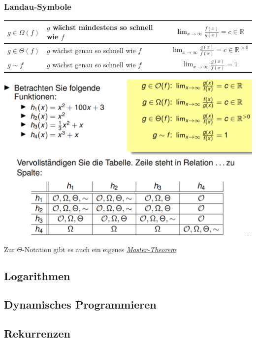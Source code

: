 \documentclass[12pt,a4paper]{article}
\begin{document}
\subsubsection{Landau-Symbole}
\begin{tabularx}{\textwidth}{|l|X|c|}
	\hline
	$g  \in  \Omega (f)$ & $g$ wächst mindestens so schnell wie $f$ & $\lim_{x \to \infty} \frac{f(x)}{g(x)} = c \in \mathbb{R}$ \\
	\hline
	$g  \in  \Theta (f)$ & $g$ wächst genau so schnell wie $f$ & $\lim_{x \to \infty} \frac{g(x)}{f(x)} = c \in \mathbb{R}^{>0}$ \\
	\hline
	$g \sim f$ & $g$ wächst genau so schnell wie $f$ & $\lim_{x \to \infty} \frac{g(x)}{f(x)} = 1$ \\
	\hline
\end{tabularx}
\begin{center}
	\includegraphics[scale=0.6]{Bilder/landau.PNG}
\end{center}
Zur $\Theta $-Notation gibt es auch ein eigenes \textit{\hyperref[sec:MasterLandau]{Master-Theorem}}.

\subsection{Logarithmen}

\subsection{Dynamisches Programmieren}

\subsection{Rekurrenzen}
\end{document}
